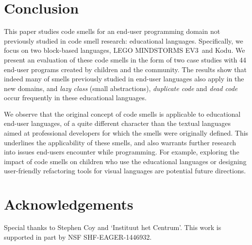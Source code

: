 \documentclass[conference]{IEEEtran}
\newcommand{\ms}{LEGO MINDSTORMS EV3}
\begin{document}
\section{Conclusion}
\label{sec:conclusions}
This paper studies code smells for an end-user programming domain not previously studied in code smell research: educational languages. Specifically, we focus on two block-based languages, \ms~and Kodu. We present an evaluation of these code smells in the form of two case studies with 44 end-user programs created by children and the community. The results show that indeed many of smells previously studied in end-user languages also apply in the new domains, and \emph{lazy class} (small abstractions), \emph{duplicate code} and \emph{dead code} occur frequently in these educational languages. 
%

We observe that the original concept of code smells is applicable to educational end-user languages, of a quite different character than the textual languages aimed at professional developers for which the smells were originally defined. This underlines the applicability of these smells, and also warrants further research into issues end-users encounter while programming. For example, exploring the impact of code smells on children who use the educational languages or designing user-friendly refactoring tools for visual languages are potential future directions. 

\balance

\section*{Acknowledgements}
Special thanks to Stephen Coy and `Instituut het Centrum'. This work is supported in part by  NSF SHF-EAGER-1446932.




\end{document}

